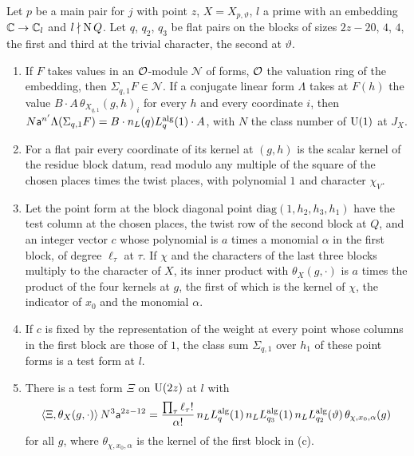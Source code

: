 \begin{lemma}\label{lem:seesaw-test}
Let $p$ be a main pair for $j$ with point $z$, $X=X_{p,\vartheta}$, $l$ a prime with an embedding $\mathbb{C}\to\mathbb{C}_l$ and $l\nmid\operatorname{N} Q$. Let $q$, $q_2$, $q_3$ be flat pairs on the blocks of sizes $2z-20$, $4$, $4$, the first and third at the trivial
character, the second at $\vartheta$.
\begin{enumerate}[label=\textup{(\alph*)}]
\item If $F$ takes values in an $\mathcal{O}$-module $\mathcal N$ of forms, $\mathcal{O}$ the valuation ring of the embedding, then $\Sigma_{q,1}F\in\mathcal N$. If a conjugate linear form $\Lambda$ takes at $F(h)$ the value $B\cdot A\,\theta_{X_{q,1}}(g,h)_i$ for every $h$
and every coordinate $i$, then $N\mathsf a^{n'}\Lambda(\Sigma_{q,1}F)=B\cdot n_L(q)L^{\rm alg}_q(1)\cdot A$, with $N$ the class number of $\operatorname{U}(1)$ at $J_X$.
\item For a flat pair every coordinate of its kernel at $(g,h)$ is the scalar kernel of the residue block datum, read modulo any multiple of the square of the chosen places times the twist places, with polynomial $1$ and
character $\chi_V$.
\item Let the point form at the block diagonal point $\mathrm{diag}(1,h_2,h_3,h_1)$ have the test column at the chosen places, the twist row of the second block at $Q$, and an integer vector $c$ whose polynomial is $a$ times a
monomial $\alpha$ in the first block, of degree $\ell_\tau$ at $\tau$. If $\chi$ and the characters of the last three blocks multiply to the character of $X$, its inner product with $\theta_X(g,\cdot)$ is $a$ times the product of the
four kernels at $g$, the first of which is the kernel of $\chi$, the indicator of $x_0$ and the monomial $\alpha$.
\item If $c$ is fixed by the representation of the weight at every point whose columns in the first block are those of $1$, the class sum $\Sigma_{q,1}$ over $h_1$ of these point forms is a test form at $l$.
\item There is a test form $\Xi$ on $\operatorname{U}(2z)$ at $l$ with
\[
  \langle\Xi,\theta_X(g,\cdot)\rangle\,N^3\mathsf a^{2z-12}=\frac{\prod_\tau\ell_\tau!}{\alpha!}\,n_LL^{\rm alg}_q(1)\,n_LL^{\rm alg}_{q_3}(1)\,n_LL^{\rm alg}_{q_2}(\vartheta)\,\theta_{\chi,x_0,\alpha}(g)
\]
for all $g$, where $\theta_{\chi,x_0,\alpha}$ is the kernel of the first block in (c).
\end{enumerate}
\end{lemma}

